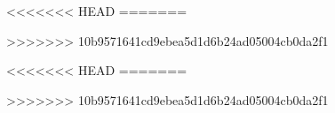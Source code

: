 \usepackage[T1]{fontenc}
\usepackage{amssymb,amsmath}
\usepackage{txfonts}
\usepackage{microtype}

\usepackage{graphicx}
\usepackage{subcaption} 

\usepackage{natbib}

\usepackage{algorithm}
\usepackage{algorithmic}

\usepackage{hyperref}
\usepackage{url}

\usepackage{color}
\usepackage{booktabs} %
\usepackage{multirow} %

\newcommand{\theHalgorithm}{\arabic{algorithm}}


\usepackage{mlp2021}

<<<<<<< HEAD
=======
\usepackage{bm,bbm}
>>>>>>> 10b9571641cd9ebea5d1d6b24ad05004cb0da2f1


\DeclareMathOperator{\softmax}{softmax}
\DeclareMathOperator{\sigmoid}{sigmoid}
\DeclareMathOperator{\sgn}{sgn}
\DeclareMathOperator{\relu}{relu}
\DeclareMathOperator{\lrelu}{lrelu}
\DeclareMathOperator{\elu}{elu}
\DeclareMathOperator{\selu}{selu}
\DeclareMathOperator{\maxout}{maxout}
<<<<<<< HEAD
=======
\newcommand{\bx}{\bm{x}}

>>>>>>> 10b9571641cd9ebea5d1d6b24ad05004cb0da2f1
